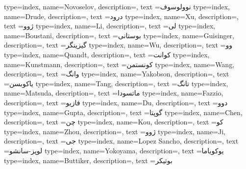 {
    type=index,
    name={Novoselov},
    description={},
    text ={نوولوسوف}
}
{
    type=index,
    name={Drude},
    description={},
    text ={درود}
}
{
    type=index,
    name={Xu},
    description={},
    text ={ژوو}
}
{
    type=index,
    name={Li},
    description={},
    text ={لی}
}
{
    type=index,
    name={Boustani},
    description={},
    text ={بوستانی}
}
{
    type=index,
    name={Guisinger},
    description={},
    text ={گیزینگر}
}
{
    type=index,
    name={Wu},
    description={},
    text ={وو}
}
{
    type=index,
    name={Quandt},
    description={},
    text ={کوانت}
}
{
    type=index,
    name={Kunstmann},
    description={},
    text ={کونستمن}
}
{
    type=index,
    name={Wang},
    description={},
    text ={وانگ}
}
{
    type=index,
    name={Yakobson},
    description={},
    text ={یاکوبسن}
}
{
    type=index,
    name={Tang},
    description={},
    text ={تانگ}
}
{
    type=index,
    name={Matsuda},
    description={},
    text ={ماتسودا}
}
{
    type=index,
    name={Fazzio},
    description={},
    text ={فازیو}
}
{
    type=index,
    name={Du},
    description={},
    text ={دوو}
}
{
    type=index,
    name={Gupta},
    description={},
    text ={گوپتا}
}
{
    type=index,
    name={Chen},
    description={},
    text ={چن}
}
{
    type=index,
    name={Kou},
    description={},
    text ={کو}
}
{
    type=index,
    name={Zhou},
    description={},
    text ={ژوو}
}
{
    type=index,
    name={Ji},
    description={},
    text ={جی}
}
{
    type=index,
    name={Lopez Sancho},
    description={},
    text ={لوپز-سانشو}
}
{
    type=index,
    name={Yokoyama},
    description={},
    text ={یوکویاما}
}
{
    type=index,
    name={Buttiker},
    description={},
    text ={بوتیکر}
}